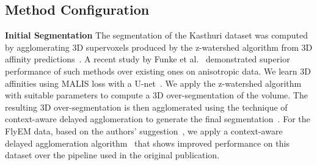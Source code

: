 
\subsection{Method Configuration}
\noindent\textbf{Initial Segmentation}
The segmentation of the Kasthuri dataset was computed by agglomerating 3D supervoxels produced by the z-watershed algorithm from 3D affinity predictions~\cite{zlateski2015image}. 
A recent study by Funke et al.~\cite{funke2017deep} demonstrated superior performance of such methods over existing ones on anisotropic data. 
We learn 3D affinities using MALIS loss with a U-net~\cite{ronneberger2015u,Turaga:2009}. 
We apply the z-watershed algorithm with suitable parameters to compute a 3D over-segmentation of the volume. 
The resulting 3D over-segmentation is then agglomerated using the technique of context-aware delayed agglomeration to generate the final segmentation~\cite{10.1371/journal.pone.0125825}.
For the FlyEM data, based on the authors' suggestion~\cite{takemura2017connectome}, we apply a context-aware delayed agglomeration algorithm~\cite{10.1371/journal.pone.0125825} that shows improved performance on this dataset over the pipeline used in the original publication. 
